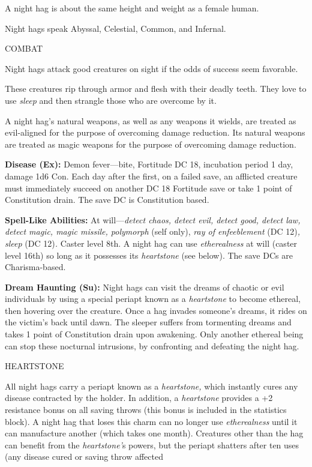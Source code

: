 \documentclass{article}
\begin{document}
A night hag is about the same height and weight as a female human.

Night hags speak Abyssal, Celestial, Common, and Infernal.

COMBAT

Night hags attack good creatures on sight if the odds of success seem favorable.

These creatures rip through armor and flesh with their deadly teeth. They love 
to use \textit{sleep }and then strangle those who are overcome by it.

A night hag's natural weapons, as well as any weapons it wields, are treated as 
evil-aligned for the purpose of overcoming damage reduction. Its natural weapons 
are treated as magic weapons for the purpose of overcoming damage reduction.

\textbf{Disease (Ex): }Demon fever---bite, Fortitude DC 18, incubation period 1 
day, damage 1d6 Con. Each day after the first, on a failed save, an afflicted creature 
must immediately succeed on another DC 18 Fortitude save or take 1 point of Constitution 
drain. The save DC is Constitution based.

\textbf{Spell-Like Abilities: }At will---\textit{detect chaos, detect evil, detect 
good, detect law, detect magic, magic missile, polymorph }(self only), \textit{ray 
of enfeeblement }(DC 12)\textit{, sleep }(DC 12)\textit{. }Caster level 8th. A 
night hag can use \textit{etherealness }at will (caster level 16th) so long as 
it possesses its \textit{heartstone }(see below). The save DCs are Charisma-based.

\textbf{Dream Haunting (Su): }Night hags can visit the dreams of chaotic or evil 
individuals by using a special periapt known as a \textit{heartstone }to become 
ethereal, then hovering over the creature. Once a hag invades someone's dreams, 
it rides on the victim's back until dawn. The sleeper suffers from tormenting dreams 
and takes 1 point of Constitution drain upon awakening. Only another ethereal being 
can stop these nocturnal intrusions, by confronting and defeating the night hag.

{\large{}HEARTSTONE}

All night hags carry a periapt known as a \textit{heartstone, }which instantly 
cures any disease contracted by the holder. In addition, a \textit{heartstone }provides 
a +2 resistance bonus on all saving throws (this bonus is included in the statistics 
block). A night hag that loses this charm can no longer use \textit{etherealness 
}until it can manufacture another (which takes one month). Creatures other than 
the hag can benefit from the \textit{heartstone'}s powers, but the periapt shatters 
after ten uses (any disease cured or saving throw affected
\end{document}
